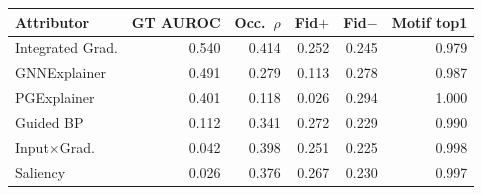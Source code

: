 \setlength{\tabcolsep}{3.6pt}
\begin{tabular}{lrrrrr}
\toprule
Attributor & GT AUROC & Occ.\ $\rho$ & Fid$+$ & Fid$-$ & Motif top1 \\
\midrule
Integrated Grad. & 0.540 & 0.414 & 0.252 & 0.245 & 0.979 \\
GNNExplainer & 0.491 & 0.279 & 0.113 & 0.278 & 0.987 \\
PGExplainer & 0.401 & 0.118 & 0.026 & 0.294 & 1.000 \\
Guided BP & 0.112 & 0.341 & 0.272 & 0.229 & 0.990 \\
Input$\times$Grad. & 0.042 & 0.398 & 0.251 & 0.225 & 0.998 \\
Saliency & 0.026 & 0.376 & 0.267 & 0.230 & 0.997 \\
\bottomrule
\end{tabular}

